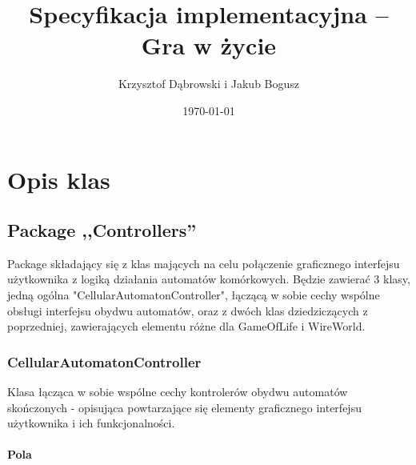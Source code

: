 \documentclass{report}
\title{Specyfikacja implementacyjna -- Gra w życie}
\author{Krzysztof Dąbrowski i Jakub Bogusz}
\date{\today}
\begin{document}
\maketitle{}

\tableofcontents{}

\chapter{Opis klas}

\section{Package ,,Controllers''}
Package składający się z klas mających na celu połączenie graficznego interfejsu użytkownika z logiką działania automatów komórkowych. Będzie zawierać 3 klasy, jedną ogólna "CellularAutomatonController", łączącą w sobie cechy wspólne obsługi interfejsu obydwu automatów, oraz z dwóch klas dziedziczących z poprzedniej, zawierających elementu różne dla GameOfLife i WireWorld.

\subsection{CellularAutomatonController}
Klasa łącząca w sobie wspólne cechy kontrolerów obydwu automatów skończonych - opisująca powtarzające się elementy graficznego interfejsu użytkownika i ich funkcjonalności.
\subsubsection{Pola}
\end{document}
